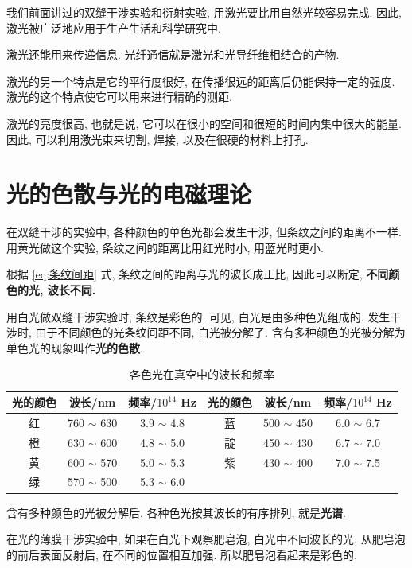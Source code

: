 \documentclass[UTF8,openany,fontset=fandol]{ctexbook}
\theoremstyle{chinesetextbook}
\begin{document}
我们前面讲过的双缝干涉实验和衍射实验, 用激光要比用自然光较容易完成. 因此, 激光被广泛地应用于生产生活和科学研究中.

激光还能用来传递信息. 光纤通信就是激光和光导纤维相结合的产物.

激光的另一个特点是它的平行度很好, 在传播很远的距离后仍能保持一定的强度. 激光的这个特点使它可以用来进行精确的测距.

激光的亮度很高, 也就是说, 它可以在很小的空间和很短的时间内集中很大的能量. 因此, 可以利用激光束来切割, 焊接, 以及在很硬的材料上打孔.
\section{光的色散与光的电磁理论}\label{sec:光的电磁理论}
在双缝干涉的实验中, 各种颜色的单色光都会发生干涉, 但条纹之间的距离不一样. 用黄光做这个实验, 条纹之间的距离比用红光时小, 用蓝光时更小.

根据 \eqref{eq:条纹间距} 式, 条纹之间的距离与光的波长成正比, 因此可以断定, \textbf{不同颜色的光, 波长不同.}

用白光做双缝干涉实验时, 条纹是彩色的. 可见, 白光是由多种色光组成的. 发生干涉时, 由于不同颜色的光条纹间距不同, 白光被分解了. 含有多种颜色的光被分解为单色光的现象叫作\textbf{光的色散}.

\begin{table}[htbp]
\centering
\caption{各色光在真空中的波长和频率}
\label{tab:各色光在真空中的波长和频率}
\begin{tabular}{|c|c|c||c|c|c|}
\hline
\textbf{光的颜色} & \textbf{波长/nm} & \textbf{频率/$10^{14}$ Hz} & \textbf{光的颜色} & \textbf{波长/nm} & \textbf{频率/$10^{14}$ Hz} \\
\hline
红 & 760 $\sim$ 630 & 3.9 $\sim$ 4.8 & 蓝 & 500 $\sim$ 450 & 6.0 $\sim$ 6.7 \\
\hline
橙 & 630 $\sim$ 600 & 4.8 $\sim$ 5.0 & 靛 & 450 $\sim$ 430 & 6.7 $\sim$ 7.0 \\
\hline
黄 & 600 $\sim$ 570 & 5.0 $\sim$ 5.3 & 紫 & 430 $\sim$ 400 & 7.0 $\sim$ 7.5 \\
\hline
绿 & 570 $\sim$ 500 & 5.3 $\sim$ 6.0 & & &  \\
\hline
\end{tabular}
\end{table}

含有多种颜色的光被分解后, 各种色光按其波长的有序排列, 就是\textbf{光谱}.

在光的薄膜干涉实验中, 如果在白光下观察肥皂泡, 白光中不同波长的光, 从肥皂泡的前后表面反射后, 在不同的位置相互加强. 所以肥皂泡看起来是彩色的.
\end{document}
